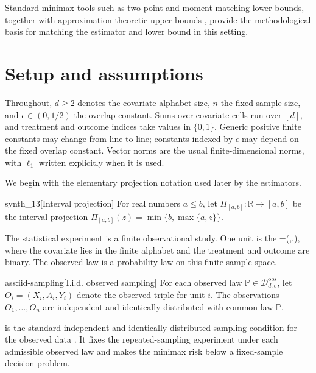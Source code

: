 \documentclass[11pt]{article}
\begin{document}
Standard minimax tools such as two-point and moment-matching lower bounds, together with approximation-theoretic upper bounds \citep{LeCam1986,Tsybakov2009,DeVore1993}, provide the methodological basis for matching the estimator and lower bound in this setting.


\section{Setup and assumptions}

Throughout, \(d\geq 2\) denotes the covariate alphabet size, \(n\) the fixed sample size, and \(\epsilon\in(0,1/2)\) the overlap constant. Sums over covariate cells run over \([d]\), and treatment and outcome indices take values in \(\{0,1\}\). Generic positive finite constants may change from line to line; constants indexed by \(\epsilon\) may depend on the fixed overlap constant. Vector norms are the usual finite-dimensional norms, with \(\ell_1\) written explicitly when it is used.

We begin with the elementary projection notation used later by the estimators.

\begin{definitionv}{synth_13}[Interval projection]
For real numbers \(a\leq b\), let \(\Pi_{[a,b]}:\mathbb R\to [a,b]\) be the interval projection \(\Pi_{[a,b]}(z)=\min\{b,\max\{a,z\}\}\).
\end{definitionv}

The statistical experiment is a finite observational study. One unit is the  =(,,), where the covariate lies in the finite alphabet  and the treatment and outcome are binary. The observed law  is a probability law on this finite sample space.

\begin{assumptionv}{ass:iid-sampling}[I.i.d. observed sampling]
For each observed law \(\mathbb P\in\mathcal D_{d,\epsilon}^{\mathrm{obs}}\), let \(O_i=(X_i,A_i,Y_i)\) denote the observed triple for unit \(i\). The observations \(O_1,\ldots,O_n\) are independent and identically distributed with common law \(\mathbb P\).
\end{assumptionv}

 is the standard independent and identically distributed sampling condition for the observed data \citep{ZengBalakrishnanHanKennedy2024Discrete}. It fixes the repeated-sampling experiment under each admissible observed law and makes the minimax risk below a fixed-sample decision problem.
\end{document}
